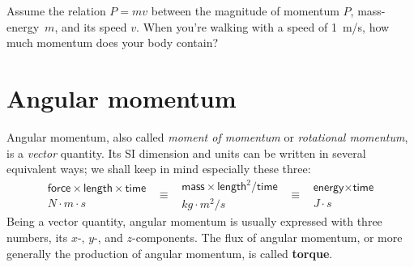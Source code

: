 \documentclass[a4paper,12pt,%
onecolumn,oneside,%
british%
]{memoir}
\renewcommand*{\|}[1][]{\nonscript\:#1\vert\nonscript\:\mathopen{}}
\newcommand*{\masse}{mass-energy}
\newcommand*{\yM}{m}%
\begin{document}
\begin{exercise}
  Assume the relation $P = \yM v$ between the magnitude of momentum $P$, \masse\ $\yM$, and its speed $v$. When you're walking with a speed of \qty{1}{m/s}, how much momentum does your body contain?
\end{exercise}



\section{Angular momentum}
\label{sec:intro_angmomentum}

Angular momentum, also called \emph{moment of momentum} or \emph{rotational momentum}, is a \emph{vector} quantity. Its SI dimension and units can be written in several equivalent ways; we shall keep in mind especially these three:
\begin{equation*}
  \begin{gathered}
    \textsf{force}\times\textsf{length}\times\textsf{time}
    \\\unit{N\cdot m\cdot s}
  \end{gathered}
\enspace  \equiv\enspace
  \begin{gathered}
  \textsf{mass}\times\textsf{length}^{2}/\textsf{time}
    \\\unit{kg\cdot m^{2}/s}
  \end{gathered}
\enspace  \equiv\enspace
  \begin{gathered}
  \textsf{energy}\times\textsf{time}
    \\\unit{J\cdot s}
  \end{gathered}
\end{equation*}
Being a vector quantity, angular momentum is usually expressed with three numbers, its $x$-, $y$-, and $z$-components. The flux of angular momentum, or more generally the production of angular momentum, is called \textbf{torque}.
%
\end{document}
